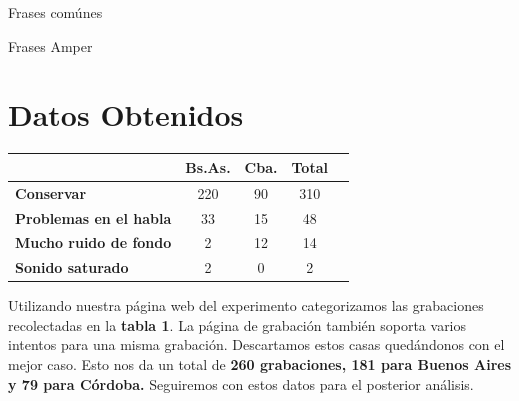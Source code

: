 \documentclass[a0,portrait]{a0poster}
\begin{document}
\begin{multicols}{2}
	
	\begin{multicols}{2}
		 Frases comúnes
		
		 Frases Amper
	\end{multicols}	


\section*{Datos Obtenidos}

\begin{table}
	\begin{tabular}{l c c c c}
		\toprule
		\textbf{}  & \textbf{Bs.As. } & \textbf{Cba.} & \textbf{Total} \\ 
		\midrule
		\textbf{Conservar}  & 220 & 90 & 310 \\ 
		\textbf{Problemas en el habla}  & 33 & 15 & 48 \\ 
		\textbf{Mucho ruido de fondo}  & 2 & 12 & 14 \\ 
		\textbf{Sonido saturado}  & 2 & 0 & 2 \\ 
		\bottomrule
	\end{tabular}
\end{table}

\large Utilizando nuestra página web del experimento categorizamos las grabaciones recolectadas en la \textbf{tabla 1}. La página de grabación también soporta varios intentos para una misma grabación. Descartamos estos casas quedándonos con el mejor caso.
Esto nos da un total de \textbf{260 grabaciones, 181 para Buenos Aires y 79 para Córdoba.} Seguiremos con estos datos para el posterior análisis.


\end{multicols}
\end{document}
